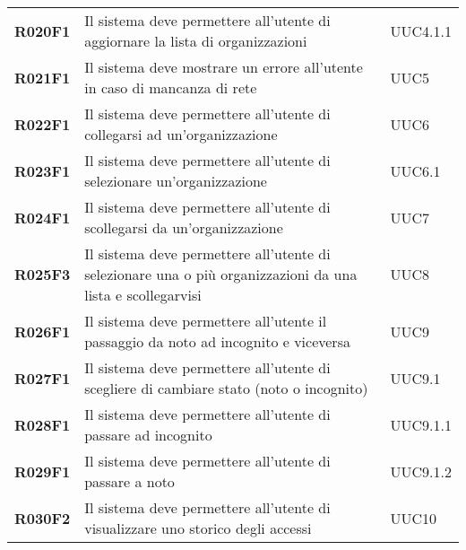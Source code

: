 \documentclass[../analisi-dei-requisiti]{subfiles}
\begin{document}
\begin{longtable}[H]{>{\centering\bfseries}m{3cm} >{\centering}m{10cm} >{\centering\arraybackslash}m{3cm}}
  R020F1                  & Il sistema deve permettere all'utente di aggiornare la lista di organizzazioni                                                                 & UUC4.1.1                      \\
  R021F1                  & Il sistema deve mostrare un errore all'utente in caso di mancanza di rete                                                                      & UUC5                          \\
  R022F1                  & Il sistema deve permettere all'utente di collegarsi ad un'organizzazione                                                                       & UUC6                          \\
  R023F1                  & Il sistema deve permettere all'utente di selezionare un'organizzazione                                                                         & UUC6.1                        \\
  R024F1                  & Il sistema deve permettere all'utente di scollegarsi da un'organizzazione                                                                      & UUC7                          \\
  R025F3                  & Il sistema deve permettere all'utente di selezionare una o più organizzazioni da una lista e scollegarvisi                                     & UUC8                          \\
  R026F1                  & Il sistema deve permettere all'utente il passaggio da noto ad incognito e viceversa                                                            & UUC9                          \\
  R027F1                  & Il sistema deve permettere all'utente di scegliere di cambiare stato (noto o incognito)                                                        & UUC9.1                        \\
  R028F1                  & Il sistema deve permettere all'utente di passare ad incognito                                                                                  & UUC9.1.1                      \\
  R029F1                  & Il sistema deve permettere all'utente di passare a noto                                                                                        & UUC9.1.2                      \\
  R030F2                  & Il sistema deve permettere all'utente di visualizzare uno storico degli accessi                                                                & UUC10                         \\

\end{longtable}
\end{document}
